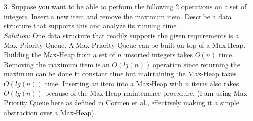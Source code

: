 \documentclass{scrartcl}
\begin{document}
\begin{flushleft}
    3. Suppose you want to be able to perform the following 2 operations on a set of integers.
    Insert a new item and remove the maximum item. Describe a data structure that supports this and
    analyze its running time.\\
    \bigskip
    \textit{Solution}: One data structure that readily supports the given requirements is a
    Max-Priority Queue. A Max-Priority Queue can be built on top of a Max-Heap. Building the
    Max-Heap from a set of $n$ unsorted integers takes $O(n)$ time. Removing the maximum item is an
    $O(lg(n))$ operation since returning the maximum can be done in constant time but maintaining
    the Max-Heap takes $O(lg(n))$ time. Inserting an item into a Max-Heap with $n$ items also takes
    $O(lg(n))$ because of the Max-Heap maintenance procedure. (I am using Max-Priority Queue here as
    defined in Cormen et al., effectively making it a simple abstraction over a Max-Heap).

\end{flushleft}
\end{document}
